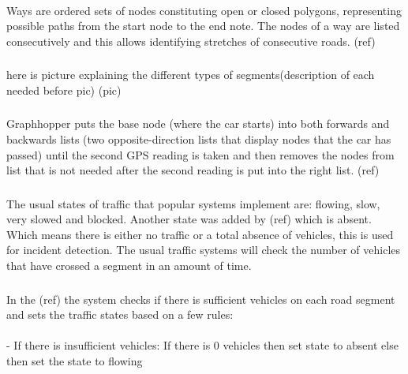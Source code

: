 \documentclass[12pt,a4paper]{article}
\begin{document}
\paragraph{}
Ways are ordered sets of nodes constituting open or closed polygons, representing possible paths from the start node to the end note. The nodes of a way are listed consecutively and this allows identifying stretches of consecutive roads. (ref) 

\subsubsection{}
here is picture explaining the different types of segments(description of each needed before pic)
(pic)

\subsubsection{}
Graphhopper puts the base node (where the car starts) into both forwards and backwards lists (two opposite-direction lists that display nodes that the car has passed) until the second GPS reading is taken and then removes the nodes from list that is not needed after the second reading is put into the right list. (ref)

\subsubsection{}
The usual states of traffic that popular systems implement are: flowing, slow, very slowed and blocked. Another state was added by (ref) which is absent. Which means there is either no traffic or a total absence of vehicles, this is used for incident detection. The usual traffic systems will check the number of vehicles that have crossed a segment in an amount of time.

\subsubsection{}
In the (ref) the system checks if there is sufficient vehicles on each road segment and sets the traffic states based on a few rules:
\paragraph{}
- If there is insufficient vehicles:
If there is 0 vehicles then set state to absent
else then set the state to flowing
\end{document}
